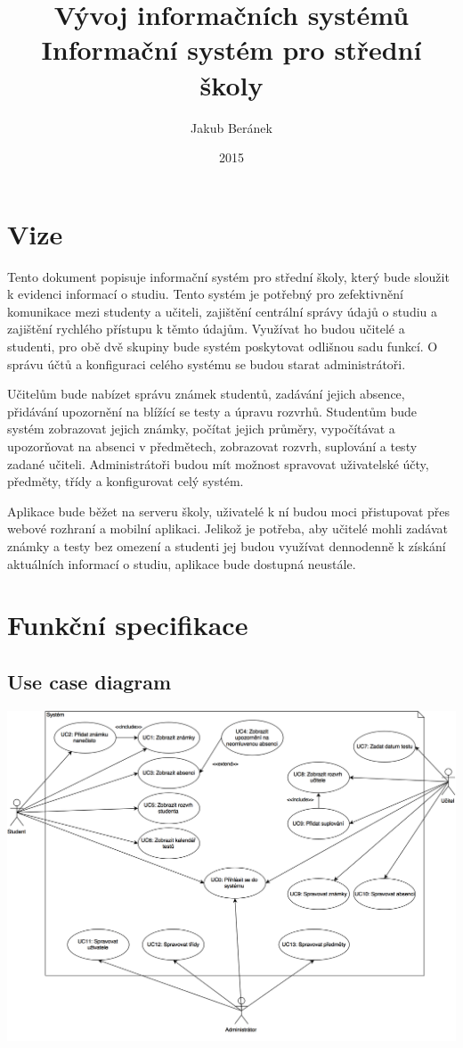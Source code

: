 \documentclass[a4paper,10pt,titlepage]{article}
\title{Vývoj informačních systémů\\Informační systém pro střední školy} %
\author{Jakub Beránek} %
\date{2015} %
\begin{document}
    \maketitle

	\section{Vize}
	Tento dokument popisuje informační systém pro střední školy, který bude sloužit k evidenci informací o studiu.
	Tento systém je potřebný pro zefektivnění komunikace mezi studenty a učiteli, zajištění centrální správy
	údajů o studiu a zajištění rychlého přístupu k těmto údajům.
	Využívat ho budou učitelé a studenti, pro obě dvě skupiny bude systém poskytovat odlišnou sadu funkcí.
	O správu účtů a konfiguraci celého systému se budou starat administrátoři.
	
	\vspace{5mm} %
	
	Učitelům bude nabízet správu známek studentů, zadávání jejich absence, přidávání upozornění na blížící se testy a úpravu rozvrhů.
	Studentům bude systém zobrazovat jejich známky, počítat jejich průměry, vypočítávat a upozorňovat na absenci v předmětech,
	zobrazovat rozvrh, suplování a testy zadané učiteli. Administrátoři budou mít možnost spravovat uživatelské účty, předměty, třídy a konfigurovat
	celý systém.
	
	\vspace{5mm} %
	
	Aplikace bude běžet na serveru školy, uživatelé k ní budou moci přistupovat přes webové rozhraní a mobilní aplikaci.
	Jelikož je potřeba, aby učitelé mohli zadávat známky a testy bez omezení a studenti jej budou využívat dennodenně k získání
	aktuálních informací o studiu, aplikace bude dostupná neustále.
	
	\section{Funkční specifikace}
	\subsection{Use case diagram}
		\includegraphics[width=\textwidth]{vis_use_case_diagram}
\end{document}
